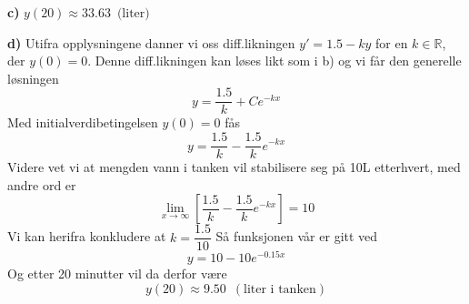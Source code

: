 \documentclass[12pt]{article}
\begin{document}
\begin{flushleft}
		\textbf{c)} $y(20) \approx 33.63 \enspace \text{(liter)}$ \newline
		
		\textbf{d)} Utifra opplysningene danner vi oss diff.likningen $y'=1.5-ky$ for en $k \in \mathbb{R}$, der $y(0)=0$. Denne diff.likningen kan løses likt som i b) og vi får den generelle løsningen $$y=\frac{1.5}{k} + Ce^{-kx}$$ Med initialverdibetingelsen $y(0)=0$ fås $$y=\frac{1.5}{k} - \frac{1.5}{k}e^{-kx}$$ Videre vet vi at mengden vann i tanken vil stabilisere seg på 10L etterhvert, med andre ord er $$\lim_{x \to \infty} \left[\frac{1.5}{k} - \frac{1.5}{k}e^{-kx}\right] = 10$$ Vi kan herifra konkludere at $k=\dfrac{1.5}{10}$ Så funksjonen vår er gitt ved $$y=10-10e^{-0.15x}$$ Og etter 20 minutter vil da derfor være $$y(20)\approx 9.50 \enspace (\text{liter i tanken})$$
		\end{flushleft}
	
\end{document}
